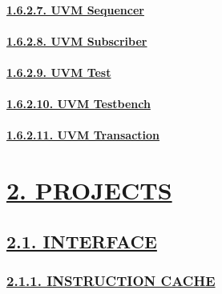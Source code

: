 \documentclass[
]{article}
\begin{document}
\hypertarget{uvm-sequencer}{%
\paragraph{\texorpdfstring{\protect\hyperlink{uvm-sequencer-1}{1.6.2.7.
UVM Sequencer}}{1.6.2.7. UVM Sequencer}}\label{uvm-sequencer}}

\hypertarget{uvm-subscriber}{%
\paragraph{\texorpdfstring{\protect\hyperlink{uvm-subscriber-1}{1.6.2.8.
UVM Subscriber}}{1.6.2.8. UVM Subscriber}}\label{uvm-subscriber}}

\hypertarget{uvm-test}{%
\paragraph{\texorpdfstring{\protect\hyperlink{uvm-test-1}{1.6.2.9. UVM
Test}}{1.6.2.9. UVM Test}}\label{uvm-test}}

\hypertarget{uvm-testbench}{%
\paragraph{\texorpdfstring{\protect\hyperlink{uvm-testbench-1}{1.6.2.10.
UVM Testbench}}{1.6.2.10. UVM Testbench}}\label{uvm-testbench}}

\hypertarget{uvm-transaction}{%
\paragraph{\texorpdfstring{\protect\hyperlink{uvm-transaction-1}{1.6.2.11.
UVM Transaction}}{1.6.2.11. UVM Transaction}}\label{uvm-transaction}}

\hypertarget{projects}{%
\section{\texorpdfstring{\protect\hyperlink{projects-1}{2.
PROJECTS}}{2. PROJECTS}}\label{projects}}

\hypertarget{interface}{%
\subsection{\texorpdfstring{\protect\hyperlink{interface-1}{2.1.
INTERFACE}}{2.1. INTERFACE}}\label{interface}}

\hypertarget{instruction-cache}{%
\subsubsection{\texorpdfstring{\protect\hyperlink{instruction-cache-1}{2.1.1.
INSTRUCTION CACHE}}{2.1.1. INSTRUCTION CACHE}}\label{instruction-cache}}
\end{document}
